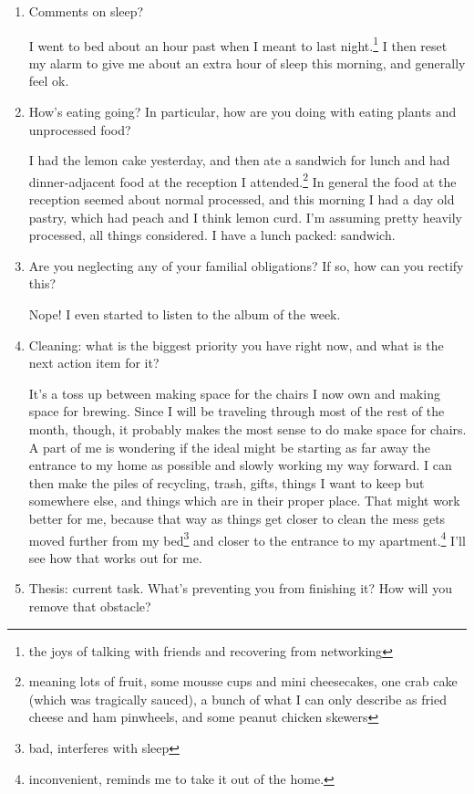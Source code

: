 \documentclass[12pt]{article}
\renewcommand{\,}{\textsuperscript{,}}
\begin{document}
\begin{enumerate}
\item Comments on sleep?

I went to bed about an hour past when I meant to last night.\footnote{the joys of talking with friends and recovering from networking}  
I then reset my alarm to give me about an extra hour of sleep this morning, and generally feel ok.

\item How's eating going? In particular, how are you doing with eating plants and unprocessed food?

I had the lemon cake yesterday, and then ate a sandwich for lunch and had dinner-adjacent food at the reception I attended.\footnote{meaning lots of fruit, some mousse cups and mini cheesecakes, one crab cake (which was tragically sauced), a bunch of what I can only describe as fried cheese and ham pinwheels, and some peanut chicken skewers}  
In general the food at the reception seemed about normal processed, and this morning I had a day old pastry, which had peach and I think lemon curd. I'm assuming pretty heavily processed, all things considered.  
I have a lunch packed: sandwich.

\item Are you neglecting any of your familial obligations? If so, how can you rectify this?

Nope! I even started to listen to the album of the week.

\item Cleaning: what is the biggest priority you have right now, and what is the next action item for it?

It's a toss up between making space for the chairs I now own and making space for brewing. Since I will be traveling through most of the rest of the month, though, it probably makes the most sense to do make space for chairs. A part of me is wondering if the ideal might be starting as far away the entrance to my home as possible and slowly working my way forward.  
I can then make the piles of recycling, trash, gifts, things I want to keep but somewhere else, and things which are in their proper place.  
That might work better for me, because that way as things get closer to clean the mess gets moved further from my bed\footnote{bad, interferes with sleep} and closer to the entrance to my apartment.\footnote{inconvenient, reminds me to take it out of the home.}  
I'll see how that works out for me.

\item Thesis: current task. What's preventing you from finishing it? How will you remove that obstacle?


\end{enumerate}
\end{document}
